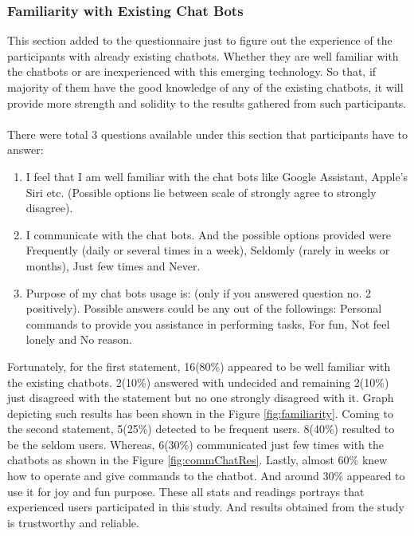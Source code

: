 \subsubsection*{Familiarity with Existing Chat Bots}
This section added to the questionnaire just to figure out the experience of the participants with already existing chatbots. Whether they are well familiar with the chatbots or are inexperienced with this emerging technology. So that, if majority of them have the good knowledge of any of the existing chatbots, it will provide more strength and solidity to the results gathered from such participants.
\\~\\
There were total 3 questions available under this section that participants have to answer:
\begin{enumerate}
    \item I feel that I am well familiar with the chat bots like Google Assistant, Apple's Siri etc. (Possible options lie between scale of strongly agree to strongly disagree).
    \item I communicate with the chat bots. And the possible options provided were Frequently (daily or several times in a week), Seldomly (rarely in weeks or months), Just few times and Never.
    \item Purpose of my chat bots usage is: (only if you answered question no. 2 positively). Possible answers could be any out of the followings: Personal commands to provide you assistance in performing tasks, For fun, Not feel lonely and No reason.
\end{enumerate}
Fortunately, for the first statement, 16(80\%) appeared to be well familiar with the existing chatbots. 2(10\%) answered with undecided and remaining 2(10\%) just disagreed with the statement but no one strongly disagreed with it. Graph depicting such results has been shown in the Figure \ref{fig:familiarity}. Coming to the second statement, 5(25\%) detected to be frequent users. 8(40\%) resulted to be the seldom users. Whereas, 6(30\%) communicated just few times with the chatbots as shown in the Figure \ref{fig:commChatRes}. Lastly, almost 60\% knew how to operate and give commands to the chatbot. And around 30\% appeared to use it for joy and fun purpose. These all stats and readings portrays that experienced users participated in this study. And results obtained from the study is trustworthy and reliable. 

